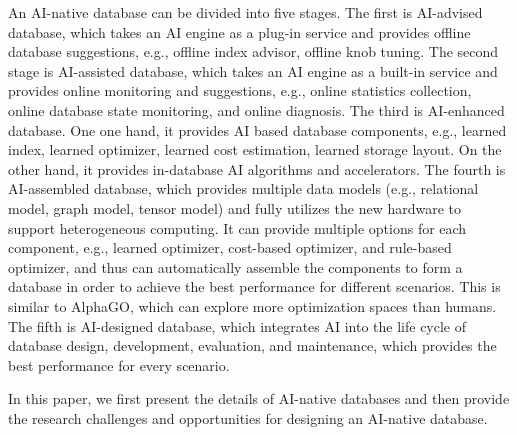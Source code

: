 An AI-native database can be divided into five stages. The first is AI-advised database, which takes an AI engine as a plug-in service and provides offline database suggestions, e.g., offline index advisor, offline knob tuning. The second stage is AI-assisted database, which takes an AI engine as a built-in service and provides online monitoring and suggestions, e.g., online statistics collection, online database state monitoring, and online diagnosis. The third is AI-enhanced database. One one hand, it provides AI based database components, e.g., learned index, learned optimizer, learned cost estimation, learned storage layout. On the other hand, it provides in-database AI algorithms and accelerators. The fourth is AI-assembled database, which provides multiple data models (e.g., relational model, graph model, tensor model) and fully utilizes the new hardware to support heterogeneous computing. It can provide multiple options for each component, e.g., learned optimizer, cost-based optimizer, and rule-based optimizer, and thus can automatically assemble the components to form a database in order to achieve the best performance for different scenarios. This is similar to AlphaGO, which can explore more optimization spaces than humans. The fifth is AI-designed database, which integrates AI into the life cycle of database design, development,  evaluation, and maintenance, which provides the best performance for every scenario. 


In this paper, we first present the details of AI-native databases and then provide the research challenges and opportunities for designing an AI-native database. 







